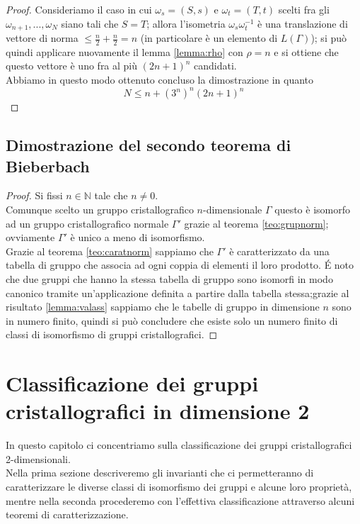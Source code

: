 \documentclass[a4paper,11pt,openright,twoside	]{book}
\begin{document}
\begin{proof}
Consideriamo il caso in cui $\omega_s = (S,s) $ e $\omega_t = (T,t)$ scelti fra gli $\omega_{n+1},...,\omega_N $ siano tali che $S = T$; allora l'isometria $\omega_s \omega_t^{-1}$ è una translazione di vettore di norma $\leq \frac{n}{2} + \frac{n}{2} = n$ (in particolare è un elemento di $L(\Gamma)$);  si può quindi applicare nuovamente il lemma \ref{lemma:rho} con $\rho = n$ e si ottiene che questo vettore è uno fra al più $(2n+1)^n$ candidati. \\
Abbiamo in questo modo ottenuto concluso la dimostrazione in quanto 
\[ N \leq n + (3^n)^n (2n+1)^n\]
\end{proof}
\section{Dimostrazione del secondo teorema di Bieberbach}
\begin{proof}
Si fissi $n \in \mathbb{N}$  tale che $n \neq 0$. \\
Comunque scelto un gruppo cristallografico $n$-dimensionale $\Gamma$ questo è isomorfo ad un gruppo cristallografico normale $\Gamma'$ grazie al teorema  \ref{teo:grupnorm}; ovviamente $\Gamma'$ è unico a meno di isomorfismo. \\
Grazie al teorema \ref{teo:caratnorm} sappiamo che $\Gamma'$ è caratterizzato da una tabella di gruppo che associa ad ogni coppia di elementi il loro prodotto. \'E  noto che due gruppi che hanno la stessa tabella di gruppo sono isomorfi in modo canonico tramite un'applicazione definita a partire dalla tabella stessa;grazie al risultato \ref{lemma:valass} sappiamo che le tabelle di gruppo in dimensione $n$ sono in numero finito, quindi si può concludere che esiste solo un numero finito di classi di isomorfismo di gruppi cristallografici. 
\end{proof}
\chapter{Classificazione dei gruppi cristallografici in dimensione 2}
In questo capitolo ci concentriamo sulla classificazione dei gruppi cristallografici 2-dimensionali. \\
Nella prima sezione descriveremo gli invarianti che ci permetteranno di caratterizzare le diverse classi di isomorfismo dei gruppi e alcune loro proprietà, mentre nella seconda procederemo con l'effettiva classificazione attraverso alcuni teoremi di caratterizzazione.  \\
\end{document}
